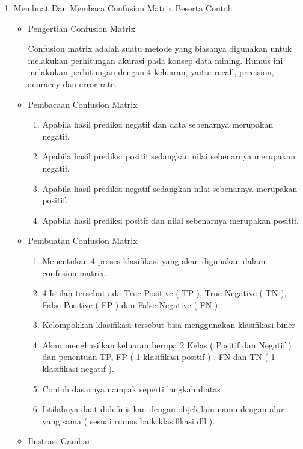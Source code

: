 \begin{enumerate}
\begin{itemize}
\end{itemize}

\par
\item Membuat Dan Membaca Confusion Matrix Beserta Contoh
\begin{itemize}
\item Pengertian Confusion Matrix
\par Confusion matrix adalah suatu metode yang biasanya digunakan untuk melakukan perhitungan akurasi pada konsep data mining. Rumus ini melakukan perhitungan dengan 4 keluaran, yaitu: recall, precision, acuraccy dan error rate.
\par
\item Pembacaan Confusion Matrix
\begin{enumerate}
\item Apabila hasil prediksi negatif dan data sebenarnya merupakan negatif.
\item Apabila hasil prediksi positif sedangkan nilai sebenarnya merupakan negatif.
\item Apabila hasil prediksi negatif sedangkan nilai sebenarnya merupakan positif.
\item Apabila hasil prediksi positif dan nilai sebenarnya merupakan positif.
\end{enumerate}
\par
\par
\item Pembuatan Confusion Matrix
\begin{enumerate}
\item Menentukan 4 proses klasifikasi yang akan digunakan dalam confusion matrix.
\item 4 Istilah tersebut ada True Positive ( TP ), True Negative ( TN ), False Positive ( FP ) dan False Negative ( FN ).
\item Kelompokkan klasifikasi tersebut bisa menggunakan klasifikasi biner
\item Akan menghasilkan keluaran berupa 2 Kelas ( Positif dan Negatif ) dan penentuan TP, FP ( 1 klasifikasi positif ) , FN dan TN ( 1 klasifikasi negatif ).
\item Contoh dasarnya nampak seperti langkah diatas
\item Istilahnya daat didefinisikan dengan objek lain namu dengan alur yang sama ( sesuai rumus baik klasifikasi dll ).
\end{enumerate}
\par

\item Ilustrasi Gambar
\par


\end{itemize}
\end{enumerate}
